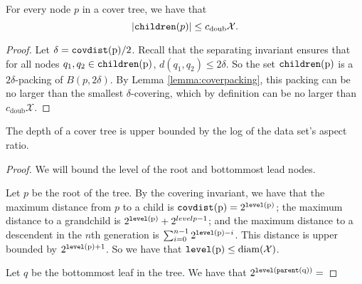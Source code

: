 \documentclass[../main.tex]{subfiles}
\newcommand{\set}[1]{\mathcal {#1}}
\newcommand{\dist}[2]{\distf({#1},{#2})}
\newcommand{\distf}{d}
\newcommand{\diam}[1]{\text{diam}({#1})}
\newcommand{\doubnum}{c_\text{doub}}
\newcommand{\p}{\ensuremath p}
\newcommand{\level}[1]{\ensuremath{\textup{\text{\ttfamily level}({#1})}}}
\newcommand{\parent}[1]{\ensuremath{\textup{\text{\ttfamily parent}({#1})}}}
\newcommand{\children}[1]{\ensuremath{\textup{\text{\ttfamily children}({#1})}}}
\newcommand{\covdist}[1]{\ensuremath{\textup{\text{\ttfamily covdist}({#1})}}}
\begin{document}
\begin{lemma}
    For every node $p$ in a cover tree, we have that
    \begin{equation}
        |\children\p| \le \doubnum \set X
        .
    \end{equation}
\end{lemma}

\begin{proof}
    Let $\delta=\covdist p/2$.
    Recall that the separating invariant ensures that for all nodes $q_1,q_2\in\children p$,
    $\dist{q_1}{q_2}\le2\delta$.
    So the set \children p is a $2\delta$-packing of $B(p,2\delta)$.
    By Lemma \ref{lemma:coverpacking}, this packing can be no larger than the smallest $\delta$-covering,
    which by definition can be no larger than $\doubnum \set X$.
\end{proof}

\begin{lemma}
    The depth of a cover tree is upper bounded by the log of the data set's aspect ratio.
\end{lemma}

\begin{proof}
    We will bound the level of the root and bottommost lead nodes.

    Let $p$ be the root of the tree.
    By the covering invariant, we have that the maximum distance from $p$ to a child is $\covdist{p}=2^\level p$; 
    the maximum distance to a grandchild is $2^\level p + 2^{level p-1}$;
    and the maximum distance to a descendent in the $n$th generation is $\sum_{i=0}^{n-1} 2^{\level p-i}$.
    This distance is upper bounded by $2^{\level p+1}$.
    So we have that $\level{p}\le\diam{\set X}$.

    Let $q$ be the bottommost leaf in the tree.
    We have that $2^\level{\parent{q}} = $
\end{proof}
\end{document}
